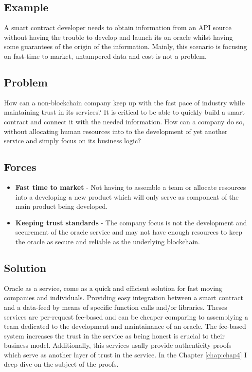 \subsection{Example}
A smart contract developer needs to obtain information from an API source without having the trouble to develop and launch its on oracle whilst having some guarantees of the origin of the information. Mainly, this scenario is focusing on fast-time to market, untampered data and cost is not a problem.


\subsection{Problem}
How can a non-blockchain company keep up with the fast pace of industry while maintaining trust in its services? It is critical to be able to quickly build a smart contract and connect it with the needed information. How can a company do so, without allocating human resources into to the development of yet another service and simply focus on its business logic?

\subsection{Forces}

\begin{itemize}
  \item \textbf{Fast time to market} - Not having to assemble a team or allocate resources into a developing a new product which will only serve as component of the main product being developed.
  \item \textbf{Keeping trust standards} - The company focus is not the development and securement of the oracle service and may not have enough resources to keep the oracle as secure and reliable as the underlying blockchain.
\end{itemize}


\subsection{Solution}
Oracle as a service, come as a quick and efficient solution for fast moving companies and individuals. Providing easy integration between a smart contract and a data-feed by means of specific function calls and/or libraries. Theses services are per-request fee-based and can be cheaper comparing to assemblying a team dedicated to the development and maintainance of an oracle. The fee-based system increases the trust in the service as being honest is crucial to their business model. Additionally, this services usally provide authenticity proofs which serve as another layer of trust in the service. In the Chapter \ref{chap:chap4} I deep dive on the subject of the proofs.

